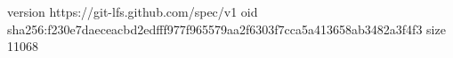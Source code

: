 version https://git-lfs.github.com/spec/v1
oid sha256:f230e7daeceacbd2edfff977f965579aa2f6303f7cca5a413658ab3482a3f4f3
size 11068
